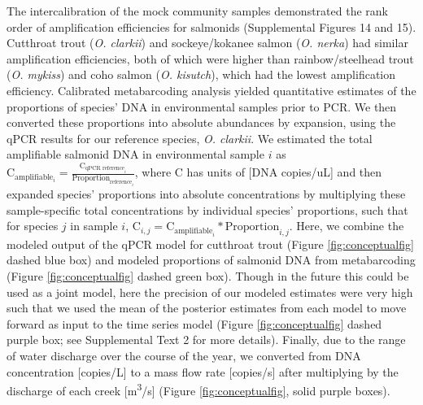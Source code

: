 \documentclass[
]{article}
\begin{document}
The intercalibration of the mock community samples demonstrated the rank
order of amplification efficiencies for salmonids (Supplemental Figures
14 and 15). Cutthroat trout (\emph{O. clarkii}) and sockeye/kokanee
salmon (\emph{O. nerka}) had similar amplification efficiencies, both of
which were higher than rainbow/steelhead trout (\emph{O. mykiss}) and
coho salmon (\emph{O. kisutch}), which had the lowest amplification
efficiency. Calibrated metabarcoding analysis yielded quantitative
estimates of the proportions of species' DNA in environmental samples
prior to PCR. We then converted these proportions into absolute
abundances by expansion, using the qPCR results for our reference
species, \emph{O. clarkii}. We estimated the total amplifiable salmonid
DNA in environmental sample \(i\) as
\(\text{C}_{\text{amplifiable}_{i}} = \frac{\text{C}_{\text{qPCR reference}_{i}}}{\text{Proportion}_{\text{reference}_{i}}}\),
where C has units of {[}DNA copies/uL{]} and then expanded species'
proportions into absolute concentrations by multiplying these
sample-specific total concentrations by individual species' proportions,
such that for species \(j\) in sample \(i\),
\(\text{C}_{i,j} = \text{C}_{\text{amplifiable}_{i}} * \text{Proportion}_{i,j}\).
Here, we combine the modeled output of the qPCR model for cutthroat
trout (Figure \ref{fig:conceptualfig} dashed blue box) and modeled
proportions of salmonid DNA from metabarcoding (Figure
\ref{fig:conceptualfig} dashed green box). Though in the future this
could be used as a joint model, here the precision of our modeled
estimates were very high such that we used the mean of the posterior
estimates from each model to move forward as input to the time series
model (Figure \ref{fig:conceptualfig} dashed purple box; see
Supplemental Text 2 for more details). Finally, due to the range of
water discharge over the course of the year, we converted from DNA
concentration {[}copies/L{]} to a mass flow rate {[}copies/s{]} after
multiplying by the discharge of each creek {[}m\textsuperscript{3}/s{]}
(Figure \ref{fig:conceptualfig}, solid purple boxes).
\end{document}
